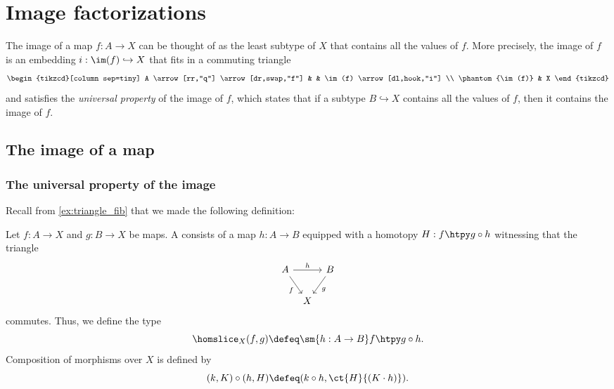 \section{Image factorizations}\label{chap:image}

The image of a map $f:A\to X$ can be thought of as the least subtype of $X$ that contains all the values of $f$. More precisely, the image of $f$ is an embedding $i:\im(f)\hookrightarrow X$ that fits in a commuting triangle
\begin{equation*}
  \begin{tikzcd}[column sep=tiny]
    A \arrow[rr,"q"] \arrow[dr,swap,"f"] & & \im(f) \arrow[dl,hook,"i"] \\
    \phantom{\im(f)} & X
  \end{tikzcd}
\end{equation*}
and satisfies the \emph{universal property} of the image of $f$, which states that if a subtype $B\hookrightarrow X$ contains all the values of $f$, then it contains the image of $f$.

\subsection{The image of a map}\label{sec:image-construction}
 
\subsubsection*{The universal property of the image}

Recall from \cref{ex:triangle_fib} that we made the following definition:

\begin{defn}
  Let $f:A\to X$ and $g:B\to X$ be maps. A  consists of a map $h:A\to B$ equipped with a homotopy $H:f\htpy g\circ h$ witnessing that the triangle
\begin{equation*}
\begin{tikzcd}[column sep=tiny]
A \arrow[rr,"h"] \arrow[dr,swap,"f"] & & B \arrow[dl,"g"] \\
& X
\end{tikzcd}
\end{equation*}
commutes. Thus, we define the type
\begin{equation*}
\homslice_X(f,g)\defeq\sm{h:A\to B}f\htpy g\circ h.
\end{equation*}
Composition of morphisms over $X$ is defined by
\begin{equation*}
  (k,K)\circ (h,H) \defeq (k\circ h,\ct{H}{(K\cdot h)}).
\end{equation*}
\end{defn}

